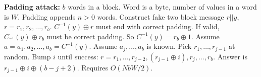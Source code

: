 {\bf Padding attack:}
$b$ words in a block.  Word is a byte, number of values in a word is $W$.
Padding appends $n>0$ words.  Construct fake two block message
$r||y$, $r= r_1, r_2, \ldots, r_b$.  $C^{-1}(y) \oplus r$ must end with
correct padding.  If valid, $C_^{-1}(y) \oplus r_b$ must be correct padding.
So $C^{-1}(y)= r_b \oplus 1$.  Assume $a= a_1, a_2, \ldots, a_b= C^{-1}(y)$.
Assume $a_j, \ldots, a_b$ is known.  Pick $r_1, \ldots, r_{j-1}$ at random.
Bump $i$ until success: $r= r_1, \ldots, r_{j-2}, (r_{j-1} \oplus i), r_{j},
\ldots, r_b$.  Answer is $r_{j-1} \oplus i \oplus (b-j+2)$.  Requires
$O(NbW/2)$.


